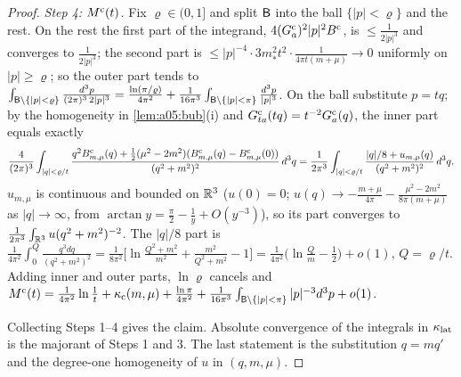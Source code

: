 \begin{proof}
\emph{Step 4: $M^{\rm c}(t)$.} Fix $\varrho\in(0,1]$ and split $\mathsf B$ into the ball $\{|p|<\varrho\}$ and the rest. On the rest the first part of the integrand, $4(G^{\rm c}_a)^2|p|^2B^{\mathrm c}$, is $\le\frac1{2|p|^3}$ and converges to $\frac1{2|p|^3}$; the second part is $\le|p|^{-4}\cdot3m_*^2t^2\cdot\frac1{4\pi t(m+\mu)}\to0$ uniformly on $|p|\ge\varrho$; so the outer part tends to $\int_{\mathsf B\setminus\{|p|<\varrho\}}\frac{d^3p}{(2\pi)^3\,2|p|^3}=\frac{\ln(\pi/\varrho)}{4\pi^2}+\frac1{16\pi^3}\int_{\mathsf B\setminus\{|p|<\pi\}}\frac{d^3p}{|p|^3}$. On the ball substitute $p=tq$; by the homogeneity in \cref{lem:a05:bub}(i) and $G^{\rm c}_{ta}(tq)=t^{-2}G^{\rm c}_a(q)$, the inner part equals exactly
\[
\frac4{(2\pi)^3}\int_{|q|<\varrho/t}\frac{q^2B^{\mathrm c}_{m,\mu}(q)+\frac12(\mu^2-2m^2)(B^{\mathrm c}_{m,\mu}(q)-B^{\mathrm c}_{m,\mu}(0))}{(q^2+m^2)^2}\,d^3q
=\frac1{2\pi^3}\int_{|q|<\varrho/t}\frac{|q|/8+u_{m,\mu}(q)}{(q^2+m^2)^2}\,d^3q .
\]
$u_{m,\mu}$ is continuous and bounded on $\mathbb R^3$ ($u(0)=0$; $u(q)\to-\frac{m+\mu}{4\pi}-\frac{\mu^2-2m^2}{8\pi(m+\mu)}$ as $|q|\to\infty$, from $\arctan y=\frac\pi2-\frac1y+O(y^{-3})$), so its part converges to $\frac1{2\pi^3}\int_{\mathbb R^3}u(q^2+m^2)^{-2}$. The $|q|/8$ part is $\frac1{4\pi^2}\int_0^Q\frac{q^3dq}{(q^2+m^2)^2}=\frac1{8\pi^2}\big[\ln\frac{Q^2+m^2}{m^2}+\frac{m^2}{Q^2+m^2}-1\big]=\frac1{4\pi^2}\big(\ln\frac Qm-\frac12\big)+o(1)$, $Q=\varrho/t$. Adding inner and outer parts, $\ln\varrho$ cancels and $M^{\rm c}(t)=\frac1{4\pi^2}\ln\frac1t+\kappa_{\rm c}(m,\mu)+\frac{\ln\pi}{4\pi^2}+\frac1{16\pi^3}\int_{\mathsf B\setminus\{|p|<\pi\}}|p|^{-3}d^3p+o(1)$.

Collecting Steps 1--4 gives the claim. Absolute convergence of the integrals in $\kappa_{\rm lat}$ is the majorant of Steps 1 and 3. The last statement is the substitution $q=mq'$ and the degree-one homogeneity of $u$ in $(q,m,\mu)$.
\end{proof}

